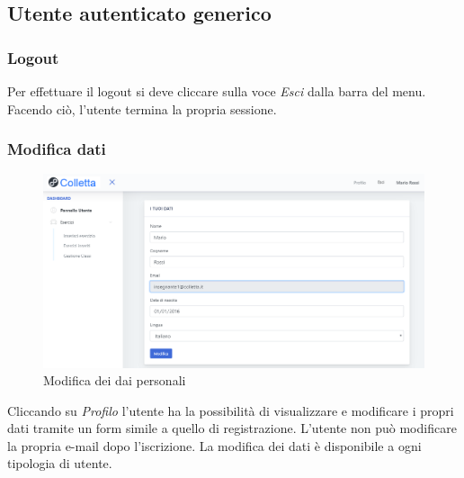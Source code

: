 \subsection{Utente autenticato generico}

    \subsubsection{Logout}
    Per effettuare il {logout} si deve cliccare sulla voce \textit{Esci} dalla barra del menu. Facendo ciò, l'utente termina la propria sessione.
    \subsubsection{Modifica dati}
    	\begin{figure}[H]
        	\centering
        	\includegraphics[width=1\linewidth]{sez/img/autenticazione/modati.PNG} 
        	\caption{Modifica dei dai personali}\label{fig:1}
    	\end{figure}
    Cliccando su \textit{Profilo} l'utente ha la possibilità di visualizzare e modificare i propri dati tramite un form simile a quello di registrazione. L'utente non può modificare la propria e-mail dopo l'iscrizione. La modifica dei dati è disponibile a ogni tipologia di utente.

\newpage
